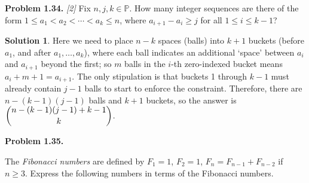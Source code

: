 \documentclass[11pt]{article}
\theoremstyle{definition}
\newtheorem*{solution}{Solution}
\newcounter{probnum}
\newcommand{\problem}[1]{%
  \setcounter{probnum}{#1}%
  \medskip
  \noindent\textbf{Problem 1.#1.}\quad
}
\begin{document}
\problem{34} \textit{[2]}
Fix $n, j, k \in \mathbb{P}$. How many integer sequences are there of the form
$1 \leq a_1 < a_2 < \cdots < a_k \leq n$, where $a_{i+1} - a_i \geq j$ for all
$1 \leq i \leq k-1$?

\begin{solution}
Here we need to place $n-k$ spaces (balls) into $k+1$ buckets (before $a_1$, and
after $a_1, \ldots, a_k$), where each ball indicates an additional `space' between
$a_i$ and $a_{i+1}$ beyond the first; so $m$ balls in the $i$-th zero-indexed bucket
means $a_i + m + 1 = a_{i+1}$. The only stipulation is that buckets 1 through $k-1$
must already contain $j-1$ balls to start to enforce the constraint. Therefore, there
are $n - (k-1)(j-1)$ balls and $k+1$ buckets, so the answer is
$\dbinom{n-(k-1)(j-1)+k-1}{k}$.
\end{solution}

\problem{35}
The \textit{Fibonacci numbers} are defined by $F_1 = 1$, $F_2 = 1$,
$F_n = F_{n-1} + F_{n-2}$ if $n \geq 3$.
Express the following numbers in terms of the Fibonacci numbers.
\end{document}
